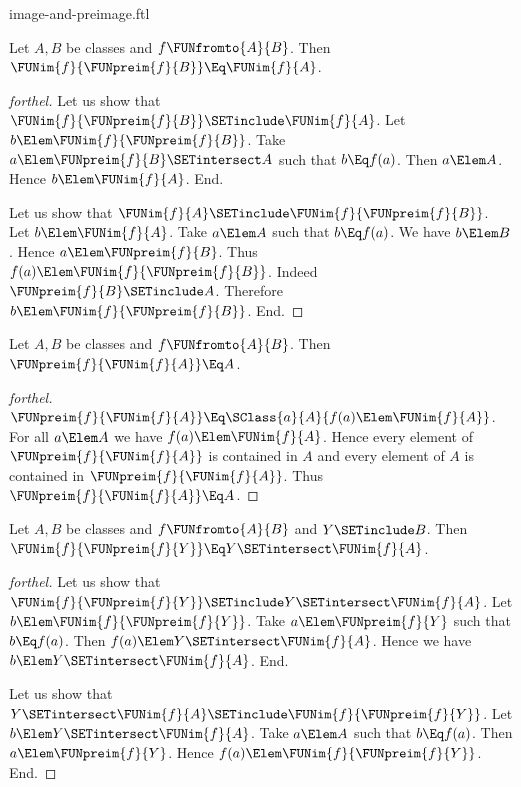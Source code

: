 \documentclass{stex}
\begin{document}
\begin{smodule}{image-and-preimage.ftl}
\begin{proposition}[forthel]
  Let $A, B$ be classes and $f \FUNfromto{A}{B}$.
  Then $\FUNim{f}{\FUNpreim{f}{B}} \Eq \FUNim{f}{A}$.
\end{proposition}
\begin{proof}[forthel]
  Let us show that $\FUNim{f}{\FUNpreim{f}{B}} \SETinclude \FUNim{f}{A}$.
    Let $b \Elem \FUNim{f}{\FUNpreim{f}{B}}$.
    Take $a \Elem \FUNpreim{f}{B} \SETintersect A$ such that $b \Eq f(a)$.
    Then $a \Elem A$.
    Hence $b \Elem \FUNim{f}{A}$.
  End.

  Let us show that $\FUNim{f}{A} \SETinclude \FUNim{f}{\FUNpreim{f}{B}}$.
    Let $b \Elem \FUNim{f}{A}$.
    Take $a \Elem A$ such that $b \Eq f(a)$.
    We have $b \Elem B$.
    Hence $a \Elem \FUNpreim{f}{B}$.
    Thus $f(a) \Elem \FUNim{f}{\FUNpreim{f}{B}}$.
    Indeed $\FUNpreim{f}{B} \SETinclude A$.
    Therefore $b \Elem \FUNim{f}{\FUNpreim{f}{B}}$.
  End.
\end{proof}

\begin{proposition}[forthel]
  Let $A, B$ be classes and $f \FUNfromto{A}{B}$.
  Then $\FUNpreim{f}{\FUNim{f}{A}} \Eq A$.
\end{proposition}
\begin{proof}[forthel]
  $\FUNpreim{f}{\FUNim{f}{A}} \Eq \SClass{a}{A}{f(a) \Elem \FUNim{f}{A}}$.
  For all $a \Elem A$ we have $f(a) \Elem \FUNim{f}{A}$.
  Hence every element of $\FUNpreim{f}{\FUNim{f}{A}}$ is contained in $A$ and every element of $A$ is contained in $\FUNpreim{f}{\FUNim{f}{A}}$.
  Thus $\FUNpreim{f}{\FUNim{f}{A}} \Eq A$.
\end{proof}

\begin{proposition}[forthel]
  Let $A, B$ be classes and $f \FUNfromto{A}{B}$ and $Y \SETinclude B$.
  Then $\FUNim{f}{\FUNpreim{f}{Y}} \Eq Y \SETintersect \FUNim{f}{A}$.
\end{proposition}
\begin{proof}[forthel]
  Let us show that $\FUNim{f}{\FUNpreim{f}{Y}} \SETinclude Y \SETintersect \FUNim{f}{A}$.
    Let $b \Elem \FUNim{f}{\FUNpreim{f}{Y}}$.
    Take $a \Elem \FUNpreim{f}{Y}$ such that $b \Eq f(a)$.
    Then $f(a) \Elem Y \SETintersect \FUNim{f}{A}$.
    Hence we have $b \Elem Y \SETintersect \FUNim{f}{A}$.
  End.

  Let us show that $Y \SETintersect \FUNim{f}{A} \SETinclude \FUNim{f}{\FUNpreim{f}{Y}}$.
    Let $b \Elem Y \SETintersect \FUNim{f}{A}$.
    Take $a \Elem A$ such that $b \Eq f(a)$.
    Then $a \Elem \FUNpreim{f}{Y}$.
    Hence $f(a) \Elem \FUNim{f}{\FUNpreim{f}{Y}}$.
  End.
\end{proof}


\end{smodule}
\end{document}
